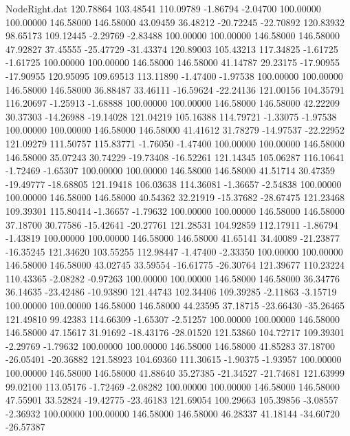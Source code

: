 \begin{filecontents}{NodeRight.dat}
 120.78864  103.48541  110.09789    -1.86794   -2.04700  100.00000  100.00000  146.58000  146.58000   43.09459   36.48212  -20.72245  -22.70892
 120.83932   98.65173  109.12445    -2.29769   -2.83488  100.00000  100.00000  146.58000  146.58000   47.92827   37.45555  -25.47729  -31.43374
 120.89003  105.43213  117.34825    -1.61725   -1.61725  100.00000  100.00000  146.58000  146.58000   41.14787   29.23175  -17.90955  -17.90955
 120.95095  109.69513  113.11890    -1.47400   -1.97538  100.00000  100.00000  146.58000  146.58000   36.88487   33.46111  -16.59624  -22.24136
 121.00156  104.35791  116.20697    -1.25913   -1.68888  100.00000  100.00000  146.58000  146.58000   42.22209   30.37303  -14.26988  -19.14028
 121.04219  105.16388  114.79721    -1.33075   -1.97538  100.00000  100.00000  146.58000  146.58000   41.41612   31.78279  -14.97537  -22.22952
 121.09279  111.50757  115.83771    -1.76050   -1.47400  100.00000  100.00000  146.58000  146.58000   35.07243   30.74229  -19.73408  -16.52261
 121.14345  105.06287  116.10641    -1.72469   -1.65307  100.00000  100.00000  146.58000  146.58000   41.51714   30.47359  -19.49777  -18.68805
 121.19418  106.03638  114.36081    -1.36657   -2.54838  100.00000  100.00000  146.58000  146.58000   40.54362   32.21919  -15.37682  -28.67475
 121.23468  109.39301  115.80414    -1.36657   -1.79632  100.00000  100.00000  146.58000  146.58000   37.18700   30.77586  -15.42641  -20.27761
 121.28531  104.92859  112.17911    -1.86794   -1.43819  100.00000  100.00000  146.58000  146.58000   41.65141   34.40089  -21.23877  -16.35245
 121.34620  103.55255  112.98447    -1.47400   -2.33350  100.00000  100.00000  146.58000  146.58000   43.02745   33.59554  -16.61775  -26.30764
 121.39677  110.23224  110.43365    -2.08282   -0.97263  100.00000  100.00000  146.58000  146.58000   36.34776   36.14635  -23.42486  -10.93890
 121.44743  102.34406  109.39285    -2.11863   -3.15719  100.00000  100.00000  146.58000  146.58000   44.23595   37.18715  -23.66430  -35.26465
 121.49810   99.42383  114.66309    -1.65307   -2.51257  100.00000  100.00000  146.58000  146.58000   47.15617   31.91692  -18.43176  -28.01520
 121.53860  104.72717  109.39301    -2.29769   -1.79632  100.00000  100.00000  146.58000  146.58000   41.85283   37.18700  -26.05401  -20.36882
 121.58923  104.69360  111.30615    -1.90375   -1.93957  100.00000  100.00000  146.58000  146.58000   41.88640   35.27385  -21.34527  -21.74681
 121.63999   99.02100  113.05176    -1.72469   -2.08282  100.00000  100.00000  146.58000  146.58000   47.55901   33.52824  -19.42775  -23.46183
 121.69054  100.29663  105.39856    -3.08557   -2.36932  100.00000  100.00000  146.58000  146.58000   46.28337   41.18144  -34.60720  -26.57387

\end{filecontents}
